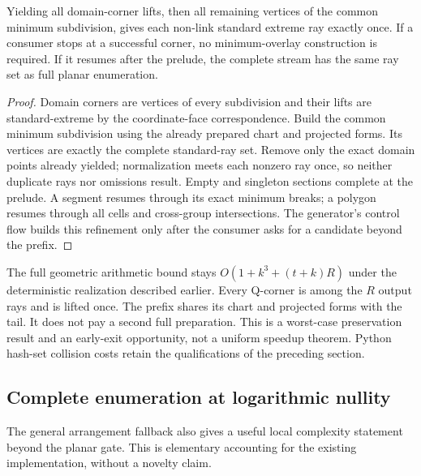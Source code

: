 \begin{proposition}
Yielding all domain-corner lifts, then all remaining vertices of the common
minimum subdivision, gives each non-link standard extreme ray exactly once.
If a consumer stops at a successful corner, no minimum-overlay construction
is required. If it resumes after the prelude, the complete stream has the
same ray set as full planar enumeration.
\end{proposition}
\begin{proof}
Domain corners are vertices of every subdivision and their lifts are
standard-extreme by the coordinate-face correspondence. Build the common
minimum subdivision using the already prepared chart and projected forms.
Its vertices are exactly the complete standard-ray set. Remove only the
exact domain points already yielded; normalization meets each nonzero ray
once, so neither duplicate rays nor omissions result. Empty and singleton
sections complete at the prelude. A segment resumes through its exact
minimum breaks; a polygon resumes through all cells and cross-group
intersections. The generator's control flow builds this refinement only
after the consumer asks for a candidate beyond the prefix.
\end{proof}

The full geometric arithmetic bound stays
$O(1+k^3+(t+k)R)$ under the deterministic realization described earlier.
Every Q-corner is among the $R$ output rays and is lifted once. The prefix
shares its chart and projected forms with the tail. It does not pay a
second full preparation. This is a worst-case preservation result and an
early-exit opportunity, not a uniform speedup theorem. Python hash-set
collision costs retain the qualifications of the preceding section.

\subsection{Complete enumeration at logarithmic nullity}

The general arrangement fallback also gives a useful local complexity
statement beyond the planar gate. This is elementary accounting for the
existing implementation, without a novelty claim.

